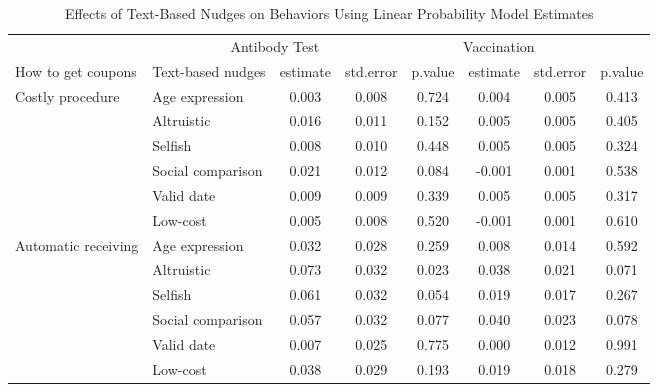 \documentclass[
  11pt,
  a4paper,
]{article}
\begin{document}
\begin{table}

\caption{\label{tab:act-reg-ftest}Effects of Text-Based Nudges on Behaviors Using Linear Probability Model Estimates}
\centering
\begin{tabular}[t]{>{\raggedright\arraybackslash}p{5em}lcccccc}
\toprule
\multicolumn{2}{c}{ } & \multicolumn{3}{c}{Antibody Test} & \multicolumn{3}{c}{Vaccination} \\
\cmidrule(l{3pt}r{3pt}){3-5} \cmidrule(l{3pt}r{3pt}){6-8}
How to get coupons & Text-based nudges & estimate & std.error & p.value & estimate  & std.error  & p.value \\
\midrule
Costly procedure & Age expression & 0.003 & 0.008 & 0.724 & 0.004 & 0.005 & 0.413\\
 & Altruistic & 0.016 & 0.011 & 0.152 & 0.005 & 0.005 & 0.405\\
 & Selfish & 0.008 & 0.010 & 0.448 & 0.005 & 0.005 & 0.324\\
 & Social comparison & 0.021 & 0.012 & 0.084 & -0.001 & 0.001 & 0.538\\
 & Valid date & 0.009 & 0.009 & 0.339 & 0.005 & 0.005 & 0.317\\
 & Low-cost & 0.005 & 0.008 & 0.520 & -0.001 & 0.001 & 0.610\\
Automatic receiving & Age expression & 0.032 & 0.028 & 0.259 & 0.008 & 0.014 & 0.592\\
 & Altruistic & 0.073 & 0.032 & 0.023 & 0.038 & 0.021 & 0.071\\
 & Selfish & 0.061 & 0.032 & 0.054 & 0.019 & 0.017 & 0.267\\
 & Social comparison & 0.057 & 0.032 & 0.077 & 0.040 & 0.023 & 0.078\\
 & Valid date & 0.007 & 0.025 & 0.775 & 0.000 & 0.012 & 0.991\\
 & Low-cost & 0.038 & 0.029 & 0.193 & 0.019 & 0.018 & 0.279\\
\bottomrule
\end{tabular}
\end{table}
\end{document}
